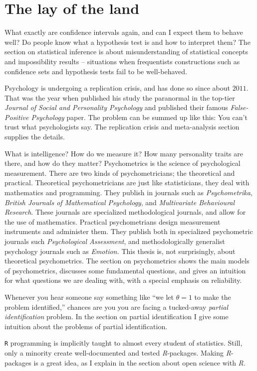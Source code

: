 \section{The lay of the land}

What exactly are confidence intervals again, and can I expect them to behave well? Do people know what a hypothesis test is and how to interpret them? The section on statistical inference is about misunderstanding of statistical concepts and impossibility results -- situations when frequentists constructions such as confidence sets and hypothesis tests fail to be well-behaved. 

Psychology is undergoing a replication crisis, and has done so since about $2011$. That was the year when \textcite{Bem2011-vq} published his study the paranormal in the top-tier \textit{Journal of Social and Personality Psychology} and \textcite{simmons_false-positive_2011} published their famous \textit{False-Positive Psychology} paper. The problem can be summed up like this: You can't trust what psychologists say. The replication crisis and meta-analysis section supplies the details.

What is intelligence? How do we measure it? How many personality traits are there, and how do they matter? Psychometrics is the science of psychological measurement. There are two kinds of psychometricians; the theoretical and practical. Theoretical psychometricians are just like statisticians, they deal with mathematics and programming. They publish in journals such as \textit{Psychometrika}, \textit{British Journals of Mathematical Psychology}, and \textit{Multivariate Behavioural Research}. These journals are specialized methodological journals, and allow for the use of mathematics. Practical psychometrians design measurement instruments and administer them. They publish both in specialized psychometric journals such \textit{Psychological Assessment}, and methodologically generalist psychology journals such as \textit{Emotion.} This thesis is, not surprisingly, about theoretical psychometrics. The section on psychometrics shows the main models of psychometrics, discusses some fundamental questions, and gives an intuition for what questions we are dealing with, with a special emphasis on reliability.

Whenever you hear someone say something like ``we let $\theta=1$ to make the problem identified,'' chances are you you are facing a tucked-away \textit{partial identification} problem. In the section on partial identification I give some intuition about the problems of partial identification.

\texttt{R} programming is implicitly taught to almost every student of statistics. Still, only a minority create well-documented and tested \textit{R}-packages. Making \textit{R}-packages is a great idea, as I explain in the section about open science with \textit{R}.